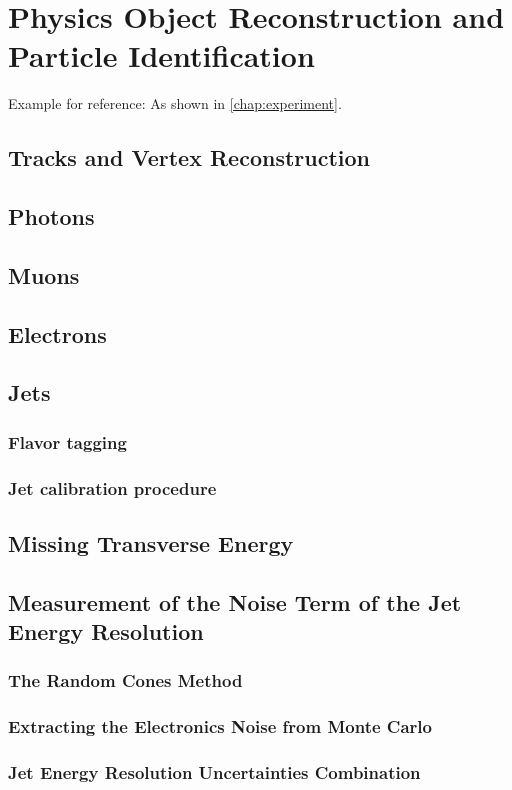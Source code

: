 
\chapter{Physics Object Reconstruction and Particle Identification}
\label{chap:objects}
Example for reference: As shown in \cref{chap:experiment}.

\section{Tracks and Vertex Reconstruction}
\section{Photons}
\section{Muons}
\section{Electrons}
\section{Jets}

\subsection{Flavor tagging}
\subsection{Jet calibration procedure}

\section{Missing Transverse Energy}

\section{Measurement of the Noise Term of the Jet Energy Resolution}
\subsection{The Random Cones Method}
\subsection{Extracting the Electronics Noise from Monte Carlo}
\subsection{Jet Energy Resolution Uncertainties Combination}

